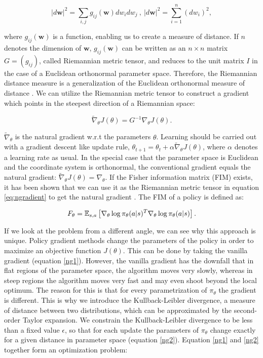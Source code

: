 \begin{equation}
	\label{eq:riem}
	|d\textbf{w}|^2 = \sum_{i,j}g_{ij}(\textbf{w}) dw_i dw_j ~,~ |d\textbf{w}|^2 = \sum_{i=1}^{n}(dw_i)^2,
\end{equation}

\noindent where $g_{ij}(\textbf{w})$ is a function, enabling us to create a measure of distance. If $n$ denotes the dimension of $\textbf{w}$, $g_{ij}(\textbf{w})$ can be written as an $n \times n$ matrix $G = (g_{ij})$, called Riemannian metric tensor, and reduces to the unit matrix $I$ in the case of a Euclidean orthonormal parameter space. Therefore, the Riemannian distance measure is a generalization of the Euclidean orthonormal measure of distance \citep{amari1998natural, haykin2009neural}. We can utilize the Riemannian metric tensor to construct a gradient which points in the steepest direction of a Riemannian space:

\begin{equation}
	\label{eq:ngradient}
	\widetilde{\nabla}_{\theta} J(\theta) = G^{-1} \nabla_\theta J(\theta).
\end{equation}

\noindent $\widetilde{\nabla}_{\theta}$ is the natural gradient w.r.t the parameters $\theta$.  Learning should be carried out with a gradient descent like update rule, $\theta_{t+1} = \theta_{t} + \alpha \widetilde{\nabla}_{\theta} J(\theta)$, where $\alpha$ denotes a learning rate as usual. In the special case that the parameter space is Euclidean and the coordinate system is orthonormal, the conventional gradient equals the natural gradient: $\widetilde{\nabla}_{\theta} J(\theta) = \nabla_{\theta}$.
If the Fisher information matrix (FIM) exists, it has been shown that we can use it as the Riemannian metric tensor in equation \ref{eq:ngradient} to get the natural gradient \citep{amari1998efficiently, peters2008natural}. The FIM of a policy is defined as:

\begin{equation}
	F_\theta=\operatorname{\mathbb{E}}_{s,a}\left[\nabla_{\theta}\log\pi_{\theta}(a|s)^{T}\nabla_{\theta}\log\pi_{\theta}(a|s)\right].
\end{equation}

\noindent If we look at the problem from a different angle, we can see why this approach is unique. Policy gradient methods change the parameters of the policy in order to maximize an objective function $J(\theta)$. This can be done by taking the vanilla gradient (equation \ref{ng1}). However, the vanilla gradient has the downfall that in flat regions of the parameter space, the algorithm moves very slowly, whereas in steep regions the algorithm moves very fast and may even shoot beyond the local optimum. The reason for this is that for every parametrization of $\pi_{\theta}$ the gradient is different. This is why we introduce the Kullback-Leibler divergence, a measure of distance between two distributions, which can be approximated by the second-order Taylor expansion. We constrain the Kullback-Leibler divergence to be less than a fixed value $\epsilon$, so that for each update the parameters of $\pi_\theta$ change exactly for a given distance in parameter space (equation \ref{ng2}). Equation \ref{ng1} and \ref{ng2} together form an optimization problem:

